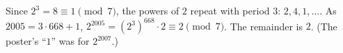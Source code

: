 Since $2^3=8\equiv1\pmod7$, the powers of $2$ repeat with period $3$: $2,4,1,\dots$. As $2005=3\cdot668+1$, $2^{2005}=(2^3)^{668}\cdot2\equiv2\pmod7$. The remainder is $\boxed{2}$. (The poster's ``$1$'' was for $2^{2007}$.)
